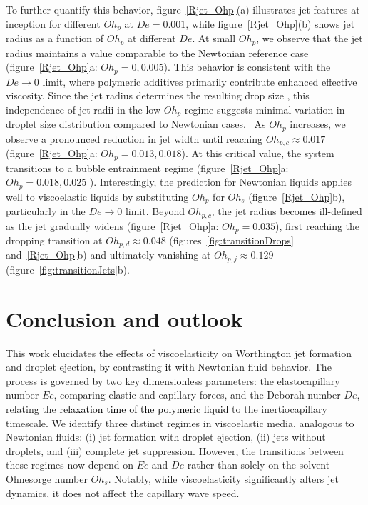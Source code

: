 \documentclass{jfm}
\newcommand{\DL}[1]{{\textcolor{black}{#1}}}
\newcommand{\oo}{\color{black} \normalfont}
\newcommand{\bb}{\color{black} \normalfont}
\begin{document}
To further quantify this behavior, figure~\ref{Rjet_Ohp}(a) illustrates jet features at inception for different $Oh_p$ at $De = 0.001$, while figure~\ref{Rjet_Ohp}(b) shows jet radius as a function of $Oh_p$ at different $De$.
\oo At small $Oh_p$, we observe that the jet radius maintains a value comparable to the Newtonian reference case (figure~\ref{Rjet_Ohp}a: $Oh_p = 0, 0.005$). This behavior is consistent with the $De \to 0$ limit, where polymeric additives primarily contribute enhanced effective viscosity. Since the jet radius determines the resulting drop size \citep{ganan2017revision,blanco2020sea}, this independence of jet radii in the low $Oh_p$ regime suggests minimal variation in droplet size distribution compared to Newtonian cases.\bb\,
As $Oh_p$ increases, we observe a pronounced reduction in jet width until reaching $Oh_{p,c} \approx 0.017$ (figure~\ref{Rjet_Ohp}a: $Oh_p = 0.013, 0.018$). At this critical value, the system transitions to a bubble entrainment regime (figure~\ref{Rjet_Ohp}a: $Oh_p = 0.018, 0.025$ \citet{gordillo2019capillary,blanco2020sea, rodriguez2023bubble}).
Interestingly, the prediction for Newtonian liquids applies well to viscoelastic liquids by substituting $Oh_p$ for $Oh_s$ (figure~\ref{Rjet_Ohp}b), particularly in the $De \to 0$ limit.
Beyond $Oh_{p,c}$, the jet radius becomes ill-defined as the jet gradually widens (figure~\ref{Rjet_Ohp}a: $Oh_p = 0.035$), first reaching the dropping transition at $Oh_{p,d} \approx 0.048$ (figures~\ref{fig:transitionDrops} and~\ref{Rjet_Ohp}b) and ultimately vanishing at $Oh_{p,j} \approx 0.129$ (figure~\ref{fig:transitionJets}b).


\section{Conclusion and outlook}
\label{sec:Conclusion}

This work elucidates the effects of viscoelasticity on Worthington jet formation and droplet ejection, \DL{by} contrasting \DL{it} with Newtonian fluid behavior. The process is governed by two key dimensionless parameters: the elastocapillary number $Ec$, comparing elastic and capillary forces, and the Deborah number $De$, relating the \DL{relaxation time of the polymeric liquid} to the inertiocapillary timescale. We identify three distinct regimes in viscoelastic media, analogous to Newtonian fluids: (i) jet formation with droplet ejection, (ii) jets without droplets, and (iii) complete jet suppression. However, the transitions between these regimes now depend on $Ec$ and $De$ rather than solely on the solvent Ohnesorge number $Oh_s$. Notably, while viscoelasticity significantly alters jet dynamics, it does not affect \DL{the} capillary wave speed.
\end{document}
